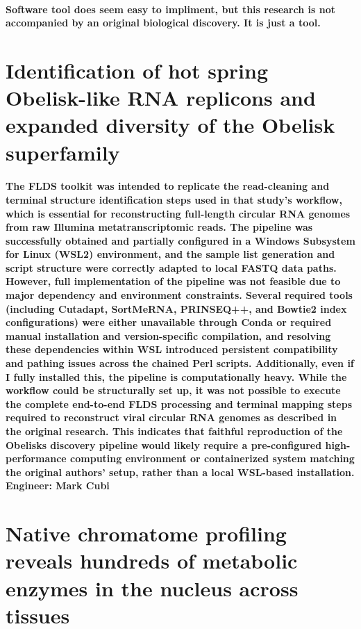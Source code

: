 \documentclass{article}
\begin{document}
\paragraph{
    Software tool does seem easy to impliment, but this research is not accompanied by an original biological discovery. It is just a tool.
}

\section{Identification of hot spring Obelisk-like RNA replicons and expanded diversity of the Obelisk superfamily \cite{Urayama2026ObeliskRNA}}

\paragraph{
    The FLDS toolkit was intended to replicate the read-cleaning and terminal structure identification steps used in that study’s workflow, which is essential for reconstructing full-length circular RNA genomes from raw Illumina metatranscriptomic reads. The pipeline was successfully obtained and partially configured in a Windows Subsystem for Linux (WSL2) environment, and the sample list generation and script structure were correctly adapted to local FASTQ data paths. However, full implementation of the pipeline was not feasible due to major dependency and environment constraints. Several required tools (including Cutadapt, SortMeRNA, PRINSEQ++, and Bowtie2 index configurations) were either unavailable through Conda or required manual installation and version-specific compilation, and resolving these dependencies within WSL introduced persistent compatibility and pathing issues across the chained Perl scripts. Additionally, even if I fully installed this, the pipeline is computationally heavy. While the workflow could be structurally set up, it was not possible to execute the complete end-to-end FLDS processing and terminal mapping steps required to reconstruct viral circular RNA genomes as described in the original research. This indicates that faithful reproduction of the Obelisks discovery pipeline would likely require a pre-configured high-performance computing environment or containerized system matching the original authors’ setup, rather than a local WSL-based installation. Engineer: Mark Cubi
}

\section{Native chromatome profiling reveals hundreds of metabolic enzymes in the nucleus across tissues \cite{Kourtis2026}}
\end{document}
